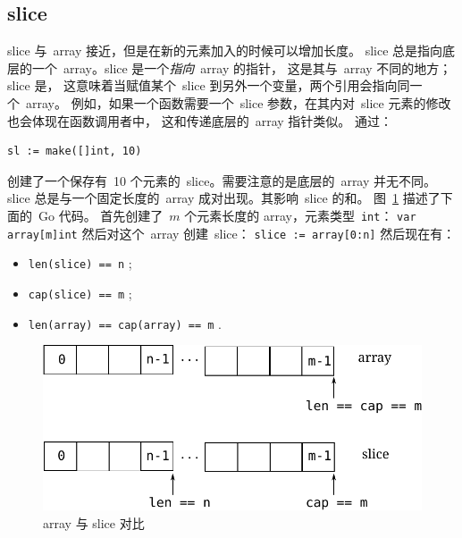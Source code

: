 \subsection{slice}
\label{sec:slices}
slice 与~array 接近，但是在新的元素加入的时候可以增加长度。
slice 总是指向底层的一个~array。slice 是一个\emph{指向}~array 的指针，
这是其与~array 不同的地方；
slice 是，
这意味着当赋值某个~slice 到另外一个变量，两个引用会指向同一个~array。
例如，如果一个函数需要一个~slice 参数，在其内对~slice 元素的修改也会体现在函数调用者中，
这和传递底层的~array 指针类似。
通过：
\begin{lstlisting}
sl := make([]int, 10)
\end{lstlisting}
创建了一个保存有~10 个元素的~slice。需要注意的是底层的~array 并无不同。
slice 总是与一个固定长度的~array 成对出现。其影响~slice 
的和。
图~\ref{fig:array-vs-slice} 描述了下面的~Go 代码。
首先创建了~$m$ 个元素长度的 array，元素类型~\lstinline{int}：
\lstinline{var array[m]int}\newline
然后对这个~array 创建~slice：
\lstinline{slice := array[0:n]}\newline
然后现在有：
\begin{itemize}
\item{\lstinline{len(slice) == n}{} ;}
\item{\lstinline{cap(slice) == m}{} ;}
\item{\lstinline{len(array) == cap(array) == m}{} .}
\end{itemize}
\begin{figure}[H]
\caption{array 与 slice 对比}
\label{fig:array-vs-slice}
\begin{center}
\includegraphics[scale=0.65]{fig/array-vs-slice.pdf}
\end{center}
\end{figure}

